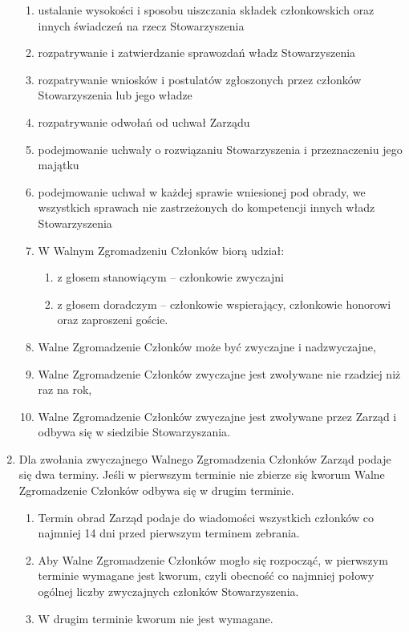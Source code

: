 \documentclass{article}
\begin{document}
\begin{enumerate}
\begin{enumerate}
        \item ustalanie wysokości i sposobu uiszczania składek członkowskich oraz innych świadczeń na rzecz Stowarzyszenia
        \item rozpatrywanie i zatwierdzanie sprawozdań władz Stowarzyszenia
        \item rozpatrywanie wniosków i postulatów zgłoszonych przez członków Stowarzyszenia lub jego władze
        \item rozpatrywanie odwołań od uchwał Zarządu
        \item podejmowanie uchwały o rozwiązaniu Stowarzyszenia i przeznaczeniu jego majątku
        \item podejmowanie uchwał w każdej sprawie wniesionej pod obrady, we wszystkich sprawach nie zastrzeżonych do kompetencji innych władz Stowarzyszenia
        \item W Walnym Zgromadzeniu Członków biorą udział:
          \begin{enumerate}
            \item z głosem stanowiącym – członkowie zwyczajni
            \item z głosem doradczym – członkowie wspierający, członkowie honorowi oraz zaproszeni goście.
          \end{enumerate}
        \item Walne Zgromadzenie Członków może być zwyczajne i nadzwyczajne,
        \item Walne Zgromadzenie Członków zwyczajne jest zwoływane nie rzadziej niż raz na rok,
        \item Walne Zgromadzenie Członków zwyczajne jest zwoływane przez Zarząd i odbywa się w siedzibie Stowarzyszania.
      \end{enumerate}
    \item Dla zwołania zwyczajnego Walnego Zgromadzenia Członków Zarząd podaje się dwa terminy. Jeśli w pierwszym terminie nie zbierze się kworum Walne Zgromadzenie Członków odbywa się w drugim terminie.
      \begin{enumerate}
        \item Termin obrad Zarząd podaje do wiadomości wszystkich członków co najmniej 14 dni przed pierwszym terminem zebrania.
        \item Aby Walne Zgromadzenie Członków mogło się rozpocząć, w pierwszym terminie wymagane jest kworum, czyli obecność co najmniej połowy ogólnej liczby zwyczajnych członków Stowarzyszenia.
        \item W drugim terminie kworum nie jest wymagane.

\end{enumerate}
\end{enumerate}
\end{document}
